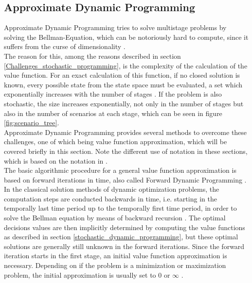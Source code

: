 \subsection{Approximate Dynamic Programming}\label{Aproximate Dynamic Programming}
Approximate Dynamic Programming tries to solve multistage problems by solving the Bellman-Equation, which can be notoriously hard to compute, since it suffers from the curse of dimensionality \cite{Powell_Clearing_the_Jungle_of_stochastic_Optimization, BertsekasVol1, BertsekasVol2}. \\
The reason for this, among the reasons described in section \ref{Challenges_stochastic_programming}, is the complexity of the calculation of the value function.
For an exact calculation of this function, if no closed solution is known, every possible state from the state space must be evaluated, a set which exponentially increases with the number of stages \cite{Powell_solving_Curses_of_Dimensionality}.
If the problem is also stochastic, the size increases exponentially, not only in the number of stages but also in the number of scenarios at each stage, which can be seen in figure \ref{fig:scenario_tree}. \\
Approximate Dynamic Programming provides several methods to overcome these challenges, one of which being value function approximation, which will be covered briefly in this section. 
Note the different use of notation in these sections, which is based on the notation in \cite{Powell_solving_Curses_of_Dimensionality}. \\
The basic algorithmic procedure for a general value function approximation is based on forward iterations in time, also called Forward Dynamic Programming \cite{POWELL2019795}.
In the classical solution methods of dynamic optimization problems, the computation steps are conducted backwards in time, i.e. starting in the temporally last time period up to the temporally first time period, in order to solve the Bellman equation by means of backward recursion \cite{POWELL2019795, Powell_solving_Curses_of_Dimensionality}.
The optimal decisions values are then implicitly determined by computing the value functions as described in section \ref{stochastic_dynamic_programming}, but these optimal solutions are generally still unknown in the forward iterations.
Since the forward iteration starts in the first stage, an initial value function approximation is necessary.
Depending on if the problem is a minimization or maximization problem, the initial approximation is usually set to $0$ or $\infty$ \cite{POWELL2019795}.
